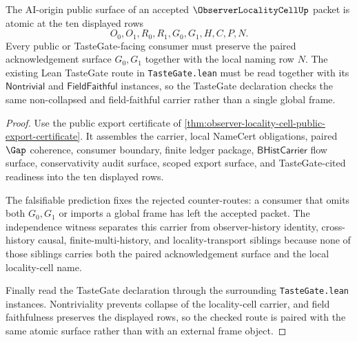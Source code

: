 \begin{theorem}
\label{thm:observer-locality-cell-atomicity-rows}
The AI-origin public surface of an accepted $\ObserverLocalityCellUp$ packet is atomic at the ten displayed rows
$$
O_0,O_1,R_0,R_1,G_0,G_1,H,C,P,N.
$$
Every public or TasteGate-facing consumer must preserve the paired acknowledgement surface $G_0,G_1$ together with the local naming row $N$. The existing Lean TasteGate route in \texttt{TasteGate.lean} must be read together with its $\mathsf{Nontrivial}$ and $\mathsf{FieldFaithful}$ instances, so the TasteGate declaration checks the same non-collapsed and field-faithful carrier rather than a single global frame.
\end{theorem}
\begin{proof}
Use the public export certificate of \autoref{thm:observer-locality-cell-public-export-certificate}. It assembles the carrier, local NameCert obligations, paired $\Gap$ coherence, consumer boundary, finite ledger package, $\mathsf{BHistCarrier}$ flow surface, conservativity audit surface, scoped export surface, and TasteGate-cited readiness into the ten displayed rows.

The falsifiable prediction fixes the rejected counter-routes: a consumer that omits both $G_0,G_1$ or imports a global frame has left the accepted packet. The independence witness separates this carrier from observer-history identity, cross-history causal, finite-multi-history, and locality-transport siblings because none of those siblings carries both the paired acknowledgement surface and the local locality-cell name.

Finally read the TasteGate declaration through the surrounding \texttt{TasteGate.lean} instances. Nontriviality prevents collapse of the locality-cell carrier, and field faithfulness preserves the displayed rows, so the checked route is paired with the same atomic surface rather than with an external frame object.
\end{proof}


